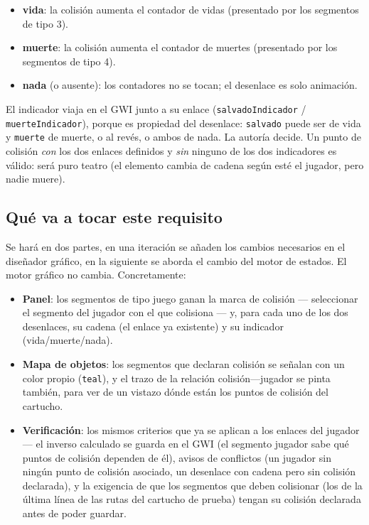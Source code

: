 \begin{itemize}
	\item \textbf{vida}: la colisión aumenta el contador de vidas (presentado por los segmentos de tipo 3).
	\item \textbf{muerte}: la colisión aumenta el contador de muertes (presentado por los segmentos de tipo 4).
	\item \textbf{nada} (o ausente): los contadores no se tocan; el
	desenlace es solo animación.
\end{itemize}

El indicador viaja en el GWI junto a su enlace
(\texttt{salvadoIndicador} / \texttt{muerteIndicador}), porque es
propiedad del desenlace: \texttt{salvado} puede ser de vida y
\texttt{muerte} de muerte, o al revés, o ambos de nada. La autoría
decide. Un punto de colisión \emph{con} los dos enlaces definidos y
\emph{sin} ninguno de los dos indicadores es válido: será puro teatro
(el elemento cambia de cadena según esté el jugador, pero nadie muere).

\subsection{Qué va a tocar este requisito}

Se hará en dos partes, en una iteración se añaden los cambios necesarios 
en el diseñador gráfico, en la siguiente se aborda el cambio del motor
de estados. El motor gráfico no cambia. Concretamente:

\begin{itemize}
	\item \textbf{Panel}: los segmentos de tipo juego ganan la marca
	de colisión — seleccionar el segmento del jugador con el que
	colisiona — y, para cada uno de los dos desenlaces, su cadena
	(el enlace ya existente) y su indicador (vida/muerte/nada).
	
	\item \textbf{Mapa de objetos}: los segmentos que declaran
	colisión se señalan con un color propio (\texttt{teal}), y el
	trazo de la relación colisión—jugador se pinta también, para ver
	de un vistazo dónde están los puntos de colisión del cartucho.
	
	\item \textbf{Verificación}: los mismos criterios que ya se
	aplican a los enlaces del jugador — el inverso calculado se
	guarda en el GWI (el segmento jugador sabe qué puntos de
	colisión dependen de él), avisos de conflictos (un jugador sin
	ningún punto de colisión asociado, un desenlace con cadena pero
	sin colisión declarada), y la exigencia de que los segmentos
	que deben colisionar (los de la última línea de las rutas del
	cartucho de prueba) tengan su colisión declarada antes de
	poder guardar.
\end{itemize}

